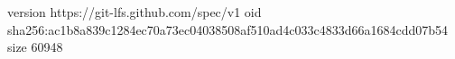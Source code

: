 version https://git-lfs.github.com/spec/v1
oid sha256:ac1b8a839c1284ec70a73ec04038508af510ad4c033c4833d66a1684cdd07b54
size 60948
